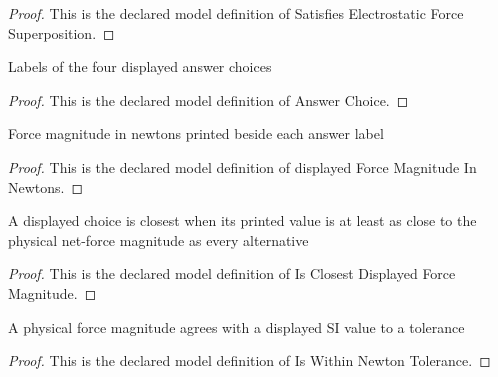 \begin{proof}
  This is the declared model definition of Satisfies Electrostatic Force Superposition.
\end{proof}
\begin{definition}
  \label{def:physics:phyx-mini-0897:phyxminiproblems-problemphyxmini0897-answerchoice}
  Labels of the four displayed answer choices
\end{definition}
\begin{proof}
  This is the declared model definition of Answer Choice.
\end{proof}
\begin{definition}
  \label{def:physics:phyx-mini-0897:phyxminiproblems-problemphyxmini0897-displayedforcemagnitudeinnewtons}
  Force magnitude in newtons printed beside each answer label
\end{definition}
\begin{proof}
  This is the declared model definition of displayed Force Magnitude In Newtons.
\end{proof}
\begin{definition}
  \label{def:physics:phyx-mini-0897:phyxminiproblems-problemphyxmini0897-isclosestdisplayedforcemagnitude}
  A displayed choice is closest when its printed value is at least as close to the physical net-force magnitude as every alternative
\end{definition}
\begin{proof}
  This is the declared model definition of Is Closest Displayed Force Magnitude.
\end{proof}
\begin{definition}
  \label{def:physics:phyx-mini-0897:phyxminiproblems-problemphyxmini0897-iswithinnewtontolerance}
  A physical force magnitude agrees with a displayed SI value to a tolerance
\end{definition}
\begin{proof}
  This is the declared model definition of Is Within Newton Tolerance.
\end{proof}
